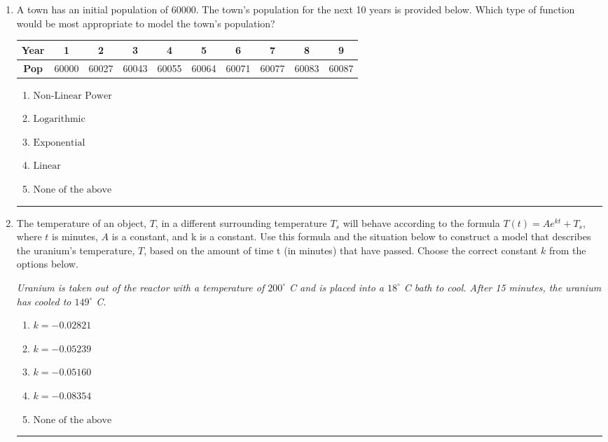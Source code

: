 \documentclass[14pt]{extbook}
\newcommand{\litem}[1]{\item#1\hspace*{-1cm}\rule{\textwidth}{0.4pt}}
\begin{document}
\begin{enumerate}
\litem{
A town has an initial population of 60000. The town's population for the next 10 years is provided below. Which type of function would be most appropriate to model the town's population?

\begin{tabular}{c|c|c|c|c|c|c|c|c|c}
\textbf{Year} &1 &2 &3 &4 &5 &6 &7 &8 &9\tabularnewline \hline
\textbf{Pop} &60000 &60027 &60043 &60055 &60064 &60071 &60077 &60083 &60087\end{tabular}\begin{enumerate}[label=\Alph*.]
\item \( \text{Non-Linear Power} \)
\item \( \text{Logarithmic} \)
\item \( \text{Exponential} \)
\item \( \text{Linear} \)
\item \( \text{None of the above} \)

\end{enumerate} }
\litem{
The temperature of an object, $T$, in a different surrounding temperature $T_s$ will behave according to the formula $T(t) = Ae^{kt} + T_s$, where $t$ is minutes, $A$ is a constant, and k is a constant. Use this formula and the situation below to construct a model that describes the uranium's temperature, $T$, based on the amount of time t (in minutes) that have passed. Choose the correct constant $k$ from the options below.
\begin{center}
    \textit{ Uranium is taken out of the reactor with a temperature of $200^{\circ}$ C and is placed into a $18^{\circ}$ C bath to cool. After 15 minutes, the uranium has cooled to $149^{\circ}$ C. }
\end{center}
\begin{enumerate}[label=\Alph*.]
\item \( k = -0.02821 \)
\item \( k = -0.05239 \)
\item \( k = -0.05160 \)
\item \( k = -0.08354 \)
\item \( \text{None of the above} \)


\end{enumerate}}
\end{enumerate}
\end{document}
